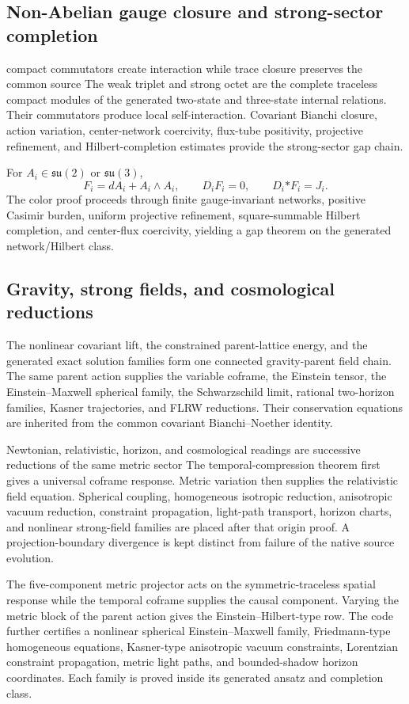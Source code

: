 \documentclass[11pt]{article}
\numberwithin{equation}{section}
\theoremstyle{remark}
\begin{document}
\subsection{Non-Abelian gauge closure and strong-sector completion}
\begin{conceptledger}{compact commutators create interaction while trace closure preserves the common source}
The weak triplet and strong octet are the complete traceless compact modules of the generated two-state and three-state internal relations. Their commutators produce local self-interaction. Covariant Bianchi closure, action variation, center-network coercivity, flux-tube positivity, projective refinement, and Hilbert-completion estimates provide the strong-sector gap chain.
\end{conceptledger}
For $A_i\in\mathfrak{su}(2)$ or $\mathfrak{su}(3)$,
\begin{equation}
 F_i=dA_i+A_i\wedge A_i,\qquad D_iF_i=0,\qquad D_i{*F_i}=J_i.
\end{equation}
The color proof proceeds through finite gauge-invariant networks, positive Casimir burden, uniform projective refinement, square-summable Hilbert completion, and center-flux coercivity, yielding a gap theorem on the generated network/Hilbert class.

\subsection{Gravity, strong fields, and cosmological reductions}
The nonlinear covariant lift, the constrained parent-lattice energy, and the generated exact solution families form one connected gravity-parent field chain. The same parent action supplies the variable coframe, the Einstein tensor, the Einstein--Maxwell spherical family, the Schwarzschild limit, rational two-horizon families, Kasner trajectories, and FLRW reductions. Their conservation equations are inherited from the common covariant Bianchi--Noether identity.
\begin{conceptledger}{Newtonian, relativistic, horizon, and cosmological readings are successive reductions of the same metric sector}
The temporal-compression theorem first gives a universal coframe response. Metric variation then supplies the relativistic field equation. Spherical coupling, homogeneous isotropic reduction, anisotropic vacuum reduction, constraint propagation, light-path transport, horizon charts, and nonlinear strong-field families are placed after that origin proof. A projection-boundary divergence is kept distinct from failure of the native source evolution.
\end{conceptledger}
The five-component metric projector acts on the symmetric-traceless spatial response while the temporal coframe supplies the causal component. Varying the metric block of the parent action gives the Einstein--Hilbert-type row. The code further certifies a nonlinear spherical Einstein--Maxwell family, Friedmann-type homogeneous equations, Kasner-type anisotropic vacuum constraints, Lorentzian constraint propagation, metric light paths, and bounded-shadow horizon coordinates. Each family is proved inside its generated ansatz and completion class.
\end{document}
